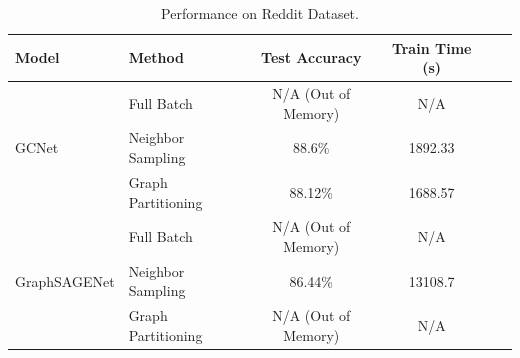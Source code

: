 \documentclass{article}
\begin{document}
\begin{table}[H]
    \centering
    \caption{Performance on Reddit Dataset.}
    \label{tab:reddit}
    \begin{tabular}{|l|l|c|c|c|c|}
        \hline
        \textbf{Model} & \textbf{Method} & \textbf{Test Accuracy} & \textbf{Train Time (s)} \\ \hline
        \multirow{3}{*}{GCNet} & Full Batch & N/A (Out of Memory) & N/A \\ \cline{2-4}
                              & Neighbor Sampling & 88.6\% & 1892.33 \\ \cline{2-4}
                              & Graph Partitioning & 88.12\% & 1688.57 \\ \hline
        \multirow{3}{*}{GraphSAGENet} & Full Batch & N/A (Out of Memory) & N/A \\ \cline{2-4}
                                      & Neighbor Sampling & 86.44\% & 13108.7 \\ \cline{2-4}
                                      & Graph Partitioning & N/A (Out of Memory) & N/A \\ \hline
    \end{tabular}
\end{table}

\end{document}
